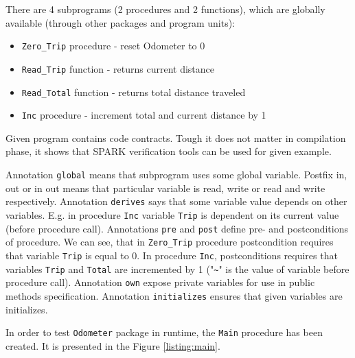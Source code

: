 There are 4 subprograms (2 procedures and 2 functions), which are globally available (through other packages and program units):
\begin{itemize}
    \item \lstinline{Zero_Trip} procedure - reset Odometer to 0
    \item \lstinline{Read_Trip} function - returns current distance
    \item \lstinline{Read_Total} function - returns total distance traveled
    \item \lstinline{Inc} procedure - increment total and current distance by 1
\end{itemize}

Given program contains code contracts. Tough it does not matter in compilation phase, it shows that SPARK verification tools can be used for given example. 

Annotation \lstinline{global} means that subprogram uses some global variable. Postfix in, out or in out means that particular variable is read, write or read and write respectively. Annotation \lstinline{derives} says that some variable value depends on other variables. E.g. in procedure \lstinline{Inc} variable \lstinline{Trip} is dependent on its current value (before procedure call). Annotations \lstinline{pre} and \lstinline{post} define pre- and postconditions of procedure. We can see, that in \lstinline{Zero_Trip} procedure postcondition requires that variable \lstinline{Trip} is equal to 0. In procedure \lstinline{Inc}, postconditions requires that variables \lstinline{Trip} and \lstinline{Total} are incremented by 1 ("\lstinline{~}" is the value of variable before procedure call). Annotation \lstinline{own} expose private variables for use in public methods specification. Annotation \lstinline{initializes} ensures that given variables are initializes. 

In order to test \lstinline{Odometer} package in runtime, the \lstinline{Main} procedure has been created. It is presented in the Figure \ref{listing:main}.

